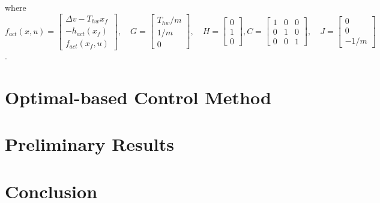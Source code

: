 \documentclass{article}
\numberwithin{equation}{section}
\begin{document}
\noindent where 
$f_{a c t}(x,u)=\left[\begin{array}{c}
    \Delta v-T_{h w} x_{f} \\
    -h_{a c t}\left(x_{f}\right) \\
    f_{a c t}\left(x_{f}, u\right)
    \end{array}\right], \quad G=\left[\begin{array}{c}
    T_{h w} / m \\
    1 / m \\
    0
    \end{array}\right], \quad H=\left[\begin{array}{l}
    0 \\
    1 \\
    0
    \end{array}\right],C=\left[\begin{array}{lll}
        1 & 0 & 0 \\
        0 & 1 & 0 \\
        0 & 0 & 1
        \end{array}\right], \quad J=\left[\begin{array}{c}
        0 \\
        0 \\
        -1 / m
        \end{array}\right]$. 

\section{Optimal-based Control Method}
\section{Preliminary Results}
\section{Conclusion}



\end{document}
